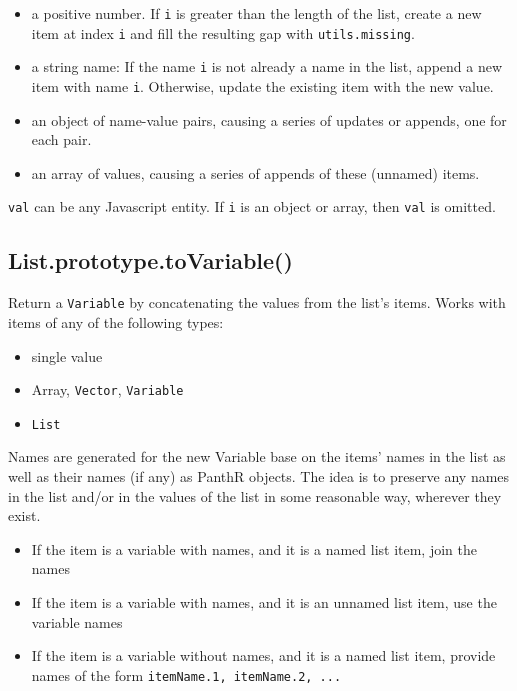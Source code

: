 \documentclass{article}
\begin{document}
\begin{itemize}

\item a positive number. If \texttt{i} is greater than the length of the list,
create a new item at index \texttt{i} and fill the resulting gap with \texttt{utils.missing}.

\item a string name:  If the name \texttt{i} is not already a name in the list, append a
new item with name \texttt{i}. Otherwise, update the existing item with the new value.

\item an object of name-value pairs, causing a series of updates or appends, one for
each pair.

\item an array of values, causing a series of appends of these (unnamed) items.

\end{itemize}

\texttt{val} can be any Javascript entity. If \texttt{i} is an object or array, then \texttt{val} is
omitted.


    \subsection{List.prototype.toVariable()}
    Return a \texttt{Variable} by concatenating the values from the list's items.
Works with items of any of the following types:


\begin{itemize}

\item single value

\item Array, \texttt{Vector}, \texttt{Variable}

\item \texttt{List}

\end{itemize}

Names are generated for the new Variable base on the items' names in the list
as well as their names (if any) as PanthR objects. The idea is to preserve any
names in the list and/or in the values of the list in some reasonable way,
wherever they exist.


\begin{itemize}

\item If the item is a variable with names, and it is a named list item, join the names

\item If the item is a variable with names, and it is an unnamed list item,
use the variable names

\item If the item is a variable without names, and it is a named list item, provide
names of the form \texttt{itemName.1, itemName.2, ...}

\end{itemize}
\end{document}
